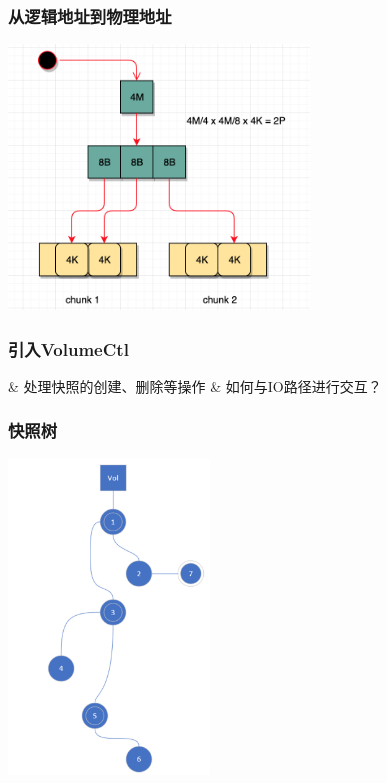 \documentclass[UTF8,8pt,xcolor=dvipsnames]{beamer}
\begin{document}
\begin{frame}[fragile]
    \frametitle{从逻辑地址到物理地址}
    \begin{center}
        \includegraphics[width=0.6\textwidth]{../imgs/row-head.png}
    \end{center}
\end{frame}

\begin{frame}[fragile]
    \frametitle{引入VolumeCtl}
    \Activate
    \begin{tcolorbox}
        \begin{easylist}[itemize]
            & 处理快照的创建、删除等操作
            & 如何与IO路径进行交互？
        \end{easylist}
    \end{tcolorbox}
    \Deactivate
\end{frame}

\begin{frame}[fragile]
    \frametitle{快照树}
    \begin{center}
        \includegraphics[width=0.4\textwidth]{../imgs/snaptree.png}
    \end{center}
\end{frame}
\end{document}
